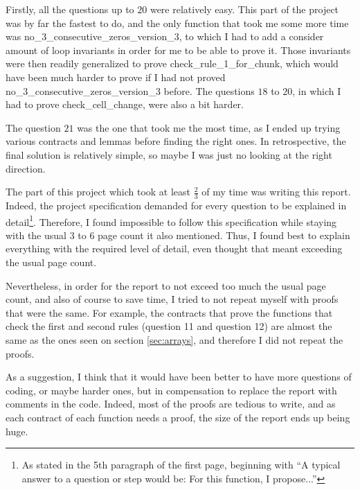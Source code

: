 \documentclass[]{StandardTemplate}
\begin{document}
Firstly, all the questions up to $ 20 $ were relatively easy. This part of the project was by far the fastest to do, and the only function that took me some more time was no\_3\_consecutive\_zeros\_version\_3, to which I had to add a consider amount of loop invariants in order for me to be able to prove it. Those invariants were then readily generalized to prove check\_rule\_1\_for\_chunk, which would have been much harder to prove if I had not proved no\_3\_consecutive\_zeros\_version\_3 before. The questions $18$ to $ 20$, in which I had to prove check\_cell\_change, were also a bit harder.

The question $ 21 $ was the one that took me the most time, as I ended up trying various contracts and lemmas before finding the right ones. In retrospective, the final solution is relatively simple, so maybe I was just no looking at the right direction.


The part of this project which took at least $ \frac{2}{3} $ of my time was writing this report. Indeed, the project specification demanded for every question to be explained in detail\footnote{As stated in the 5th paragraph of the first page, beginning with ``A typical answer to a question or step would be: For this function, I propose...''}. Therefore, I found impossible to follow this specification while staying with the usual $ 3 $ to $ 6 $ page count it also mentioned. Thus, I found best to explain everything with the required level of detail, even thought that meant exceeding the usual page count.

Nevertheless, in order for the report to not exceed too much the usual page count, and also of course to save time, I tried to not repeat myself with proofs that were the same. For example, the contracts that prove the functions that check the first and second rules (question 11 and question 12) are almost the same as the ones seen on section \ref{sec:arrays}, and therefore I did not repeat the proofs.

As a suggestion, I think that it would have been better to have more questions of coding, or maybe harder ones, but in compensation to replace the report with comments in the code. Indeed, most of the proofs are tedious to write, and as each contract of each function needs a proof, the size of the report ends up being huge.


 
\end{document}

